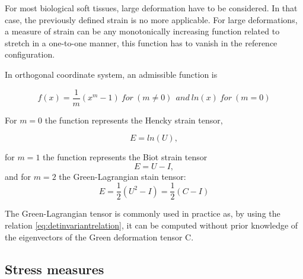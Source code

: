 For most biological soft tissues, large deformation have to be considered. In that case, the previously defined strain is no more applicable. For large deformations, a measure of strain can be any monotonically increasing function related to stretch in a one-to-one manner, this function has to vanish in the reference configuration.

In orthogonal coordinate system, an admissible function is 

\begin{equation}
f(x) = \frac{1}{m}(x^m-1) \ for \ (m \neq 0)\  \ and \ ln(x) \ for \ (m=0)
\end{equation}


For $m = 0$ the function represents the Hencky strain tensor, 

\begin{equation}
E = ln(U), 
\end{equation}

for $m=1$  the function represents the Biot strain tensor 
\begin{equation}
E = U-I,
\end{equation}
and for $m=2$ the Green-Lagrangian stain tensor:
\begin{equation}
E = \frac{1}{2}(U^2-I) =  \frac{1}{2}(C-I)
\end{equation}

The Green-Lagrangian tensor is commonly used in practice as, by using the relation \ref{eq:detinvariantrelation}, it can be computed without prior knowledge of the eigenvectors of the Green deformation tensor C.
%

\subsection{Stress measures}%

